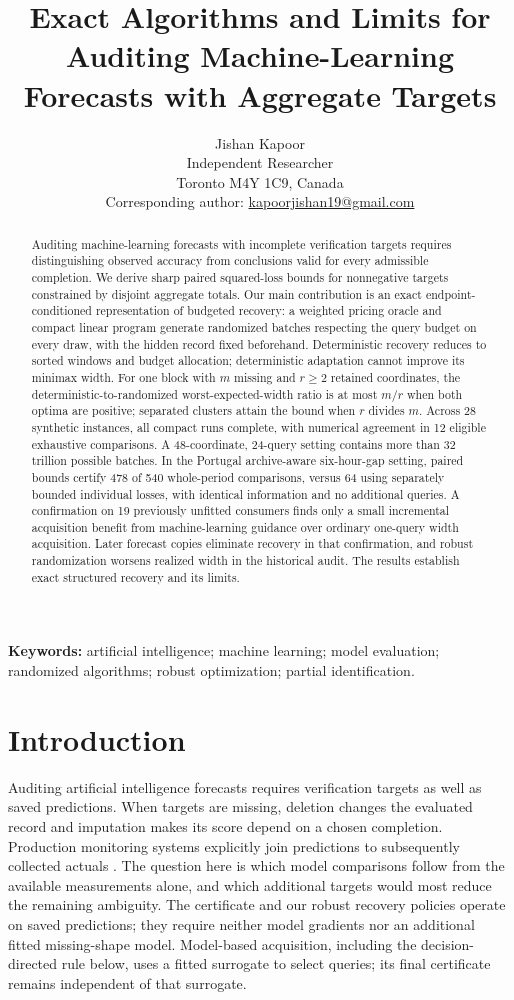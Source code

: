 \documentclass[12pt]{article}
\title{Exact Algorithms and Limits for Auditing Machine-Learning Forecasts with Aggregate Targets}
\author{Jishan Kapoor\\
Independent Researcher\\
Toronto M4Y 1C9, Canada\\
Corresponding author: \href{mailto:kapoorjishan19@gmail.com}{kapoorjishan19@gmail.com}}
\date{}
\begin{document}
\maketitle

\begin{abstract}
Auditing machine-learning forecasts with incomplete verification targets requires distinguishing observed accuracy from conclusions valid for every admissible completion. We derive sharp paired squared-loss bounds for nonnegative targets constrained by disjoint aggregate totals. Our main contribution is an exact endpoint-conditioned representation of budgeted recovery: a weighted pricing oracle and compact linear program generate randomized batches respecting the query budget on every draw, with the hidden record fixed beforehand. Deterministic recovery reduces to sorted windows and budget allocation; deterministic adaptation cannot improve its minimax width. For one block with $m$ missing and $r\geq2$ retained coordinates, the deterministic-to-randomized worst-expected-width ratio is at most $m/r$ when both optima are positive; separated clusters attain the bound when $r$ divides $m$. Across 28 synthetic instances, all compact runs complete, with numerical agreement in 12 eligible exhaustive comparisons. A 48-coordinate, 24-query setting contains more than 32 trillion possible batches. In the Portugal archive-aware six-hour-gap setting, paired bounds certify 478 of 540 whole-period comparisons, versus 64 using separately bounded individual losses, with identical information and no additional queries. A confirmation on 19 previously unfitted consumers finds only a small incremental acquisition benefit from machine-learning guidance over ordinary one-query width acquisition. Later forecast copies eliminate recovery in that confirmation, and robust randomization worsens realized width in the historical audit. The results establish exact structured recovery and its limits.
\end{abstract}
\noindent\textbf{Keywords:} artificial intelligence; machine learning; model evaluation;
randomized algorithms; robust optimization; partial identification.

\section{Introduction}
Auditing artificial intelligence forecasts requires verification targets
as well as saved predictions. When targets are missing, deletion changes
the evaluated record and imputation makes its score depend on a chosen
completion. Production monitoring systems explicitly join predictions to
subsequently collected actuals \cite{azuremonitor,awsmonitor}. The question
here is which model comparisons follow from the available measurements
alone, and which additional targets would most reduce the remaining ambiguity.
The certificate and our robust recovery policies operate on saved predictions;
they require neither model gradients nor an additional fitted missing-shape
model. Model-based acquisition, including the decision-directed rule below, uses a fitted surrogate to select queries; its final certificate remains independent of that surrogate.
\end{document}
